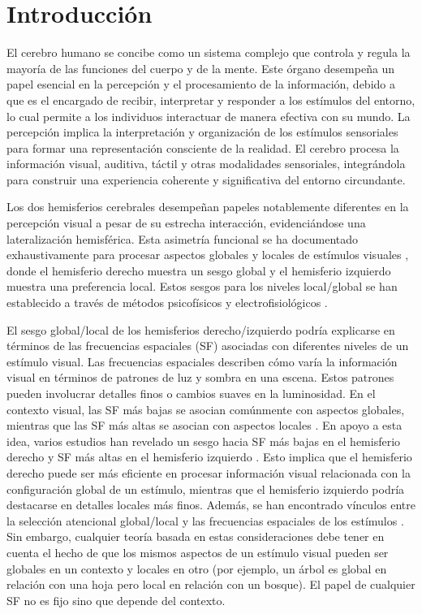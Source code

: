 \chapter*{Introducción}\label{chapter:introduction}

	El cerebro humano se concibe como un sistema complejo que controla y regula la mayoría de las funciones del cuerpo y de la mente. Este \'organo desempeña un papel esencial en la percepción y el procesamiento de la información, debido a que es el encargado de recibir, interpretar y responder a los estímulos del entorno, lo cual permite a los individuos interactuar de manera efectiva con su mundo. La percepción implica la interpretación y organización de los estímulos sensoriales para formar una representación consciente de la realidad. El cerebro procesa la información visual, auditiva, táctil y otras modalidades sensoriales, integrándola para construir una experiencia coherente y significativa del entorno circundante.
	
	Los dos hemisferios cerebrales desempeñan papeles notablemente diferentes en la percepción visual a pesar de su estrecha interacción, evidenciándose una lateralización hemisférica. Esta asimetría funcional se ha documentado exhaustivamente para procesar aspectos globales y locales de estímulos visuales \cite{flevaris_spatial_2016}, donde el hemisferio derecho muestra un sesgo global y el hemisferio izquierdo muestra una preferencia local. Estos sesgos para los niveles local/global se han establecido a través de métodos psicofísicos \cite{brederoo_hemispheric_2017, brederoo_reproducibility_2019} y electrofisiológicos \cite{flevaris_attending_2014, iglesias-fuster_asynchronous_2015, jiang_neural_2005}.
	
	El sesgo global/local de los hemisferios derecho/izquierdo podría explicarse en términos de las frecuencias espaciales (SF) asociadas con diferentes niveles de un estímulo visual. Las frecuencias espaciales describen cómo varía la información visual en términos de patrones de luz y sombra en una escena. Estos patrones pueden involucrar detalles finos o cambios suaves en la luminosidad. En el contexto visual, las SF más bajas se asocian comúnmente con aspectos globales, mientras que las SF más altas se asocian con aspectos locales \cite{flevaris_spatial_2016}. En apoyo a esta idea, varios estudios han revelado un sesgo hacia SF más bajas en el hemisferio derecho y SF más altas en el hemisferio izquierdo \cite{flevaris_spatial_2016}. Esto implica que el hemisferio derecho puede ser más eficiente en procesar información visual relacionada con la configuración global de un estímulo, mientras que el hemisferio izquierdo podría destacarse en detalles locales más finos. Además, se han encontrado vínculos entre la selección atencional global/local y las frecuencias espaciales de los est\'imulos \cite{flevaris_spatial_2016}. Sin embargo, cualquier teoría basada en estas consideraciones debe tener en cuenta el hecho de que los mismos aspectos de un estímulo visual pueden ser globales en un contexto y locales en otro (por ejemplo, un árbol es global en relación con una hoja pero local en relación con un bosque). El papel de cualquier SF no es fijo sino que depende del contexto.	
	
